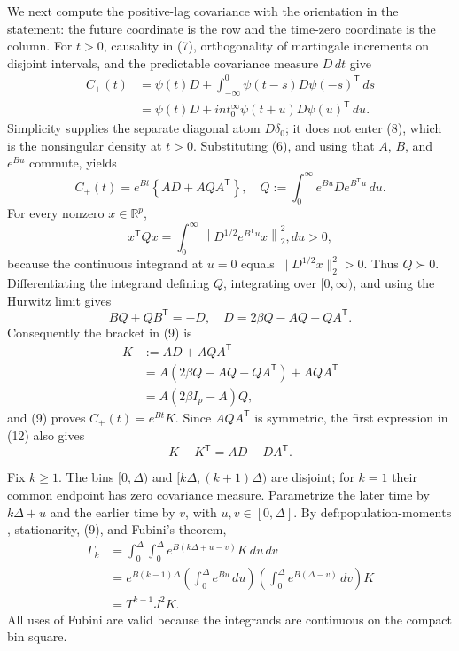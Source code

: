 We next compute the positive-lag covariance with the orientation in the statement: the future coordinate is the row and the time-zero coordinate is the column.  For \(t>0\), causality in (7), orthogonality of martingale increments on disjoint intervals, and the predictable covariance measure \(D\,dt\) give
\[
 \begin{aligned}
 C_{+}(t)
 &=\psi(t)D+
   \int_{-\infty}^{0}\psi(t-s)D\psi(-s)^{\mathsf T}\,ds\\
 &=\psi(t)D+int_0^\infty\psi(t+u)D\psi(u)^{\mathsf T}\,du.
 \end{aligned}
\tag{8}
\]
Simplicity supplies the separate diagonal atom \(D\delta_0\); it does not enter (8), which is the nonsingular density at \(t>0\).  Substituting (6), and using that \(A\), \(B\), and \(e^{Bu}\) commute, yields
\[
 C_{+}(t)
 =e^{Bt}\left\{AD+AQA^{\mathsf T}\right\},\quad
 Q:=\int_0^\infty e^{Bu}De^{B^{\mathsf T}u}\,du.
\tag{9}
\]
For every nonzero \(x\in\mathbb R^p\),
\[
 x^{\mathsf T}Qx
 =\int_0^\infty
 \left\|D^{1/2}e^{B^{\mathsf T}u}x\right\|_2^2,du>0,
\tag{10}
\]
because the continuous integrand at \(u=0\) equals \(\|D^{1/2}x\|_2^2>0\).  Thus \(Q\succ0\).  Differentiating the integrand defining \(Q\), integrating over \([0,\infty)\), and using the Hurwitz limit gives
\[
 BQ+QB^{\mathsf T}=-D,\quad
 D=2\beta Q-AQ-QA^{\mathsf T}.
\tag{11}
\]
Consequently the bracket in (9) is
\[
 \begin{aligned}
 K&:=AD+AQA^{\mathsf T}\\
 &=A(2\beta Q-AQ-QA^{\mathsf T})+AQA^{\mathsf T}\\
 &=A(2\beta I_p-A)Q,
 \end{aligned}
\tag{12}
\]
and (9) proves \(C_{+}(t)=e^{Bt}K\).  Since \(AQA^{\mathsf T}\) is symmetric, the first expression in (12) also gives
\[
 K-K^{\mathsf T}=AD-DA^{\mathsf T}.
\tag{13}
\]

Fix \(k\geq1\).  The bins \([0,\Delta)\) and \([k\Delta,(k+1)\Delta)\) are disjoint; for \(k=1\) their common endpoint has zero covariance measure.  Parametrize the later time by \(k\Delta+u\) and the earlier time by \(v\), with \(u,v\in[0,\Delta]\).  By \(\text{def:population-moments}\), stationarity, (9), and Fubini's theorem,
\[
 \begin{aligned}
 \Gamma_k
 &=\int_0^\Delta\!\int_0^\Delta
 e^{B(k\Delta+u-v)}K\,du\,dv\\
 &=e^{B(k-1)\Delta}
 \left(\int_0^\Delta e^{Bu}\,du\right)
 \left(\int_0^\Delta e^{B(\Delta-v)}\,dv\right)K\\
 &=T^{k-1}J^2K.
 \end{aligned}
\tag{14}
\]
All uses of Fubini are valid because the integrands are continuous on the compact bin square.

